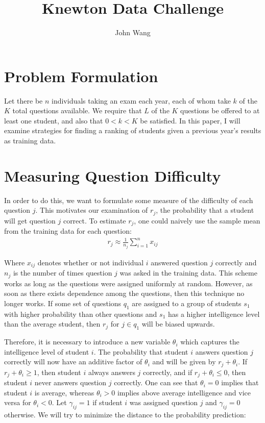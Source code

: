 \documentclass[psamsfonts]{amsart}
\title{Knewton Data Challenge}
\author{John Wang}
\begin{document}
\maketitle

\section{Problem Formulation}

Let there be $n$ individuals taking an exam each year, each of whom take $k$ of the $K$ total questions available. We require that $L$ of the $K$ questions be offered to at least one student, and also that $0 < k < K$ be satisfied. In this paper, I will examine strategies for finding a ranking of students given a previous year's results as training data.

\section{Measuring Question Difficulty}

In order to do this, we want to formulate some measure of the difficulty of each question $j$. This motivates our examination of $r_j$, the probability that a student will get question $j$ correct. To estimate $r_j$, one could naively use the sample mean from the training data for each question:
\begin{eqnarray}
r_j \approx \frac{1}{n_j} \sum_{i=1}^n x_{ij}
\end{eqnarray}

Where $x_{ij}$ denotes whether or not individual $i$ answered question $j$ correctly and $n_j$ is the number of times question $j$ was asked in the training data. This scheme works as long as the questions were assigned uniformly at random. However, as soon as there exists dependence among the questions, then this technique no longer works. If some set of questions $q_1$ are assigned to a group of students $s_1$ with higher probability than other questions and $s_1$ has a higher intelligence level than the average student, then $r_j$ for $j \in q_1$ will be biased upwards. 

Therefore, it is necessary to introduce a new variable $\theta_i$ which captures the intelligence level of student $i$. The probability that student $i$ answers question $j$ correctly will now have an additive factor of $\theta_i$ and will be given by $r_j + \theta_i$. If $r_j + \theta_i \geq 1$, then student $i$ always answers $j$ correctly, and if $r_j + \theta_i \leq 0$, then student $i$ never answers question $j$ correctly. One can see that $\theta_i = 0$ implies that student $i$ is average, whereas $\theta_i > 0$ implies above average intelligence and vice versa for $\theta_i < 0$. Let $\gamma_{ij} = 1$ if student $i$ was assigned question $j$ and $\gamma_{ij} = 0$ otherwise. We will try to minimize the distance to the probability prediction:
\end{document}
